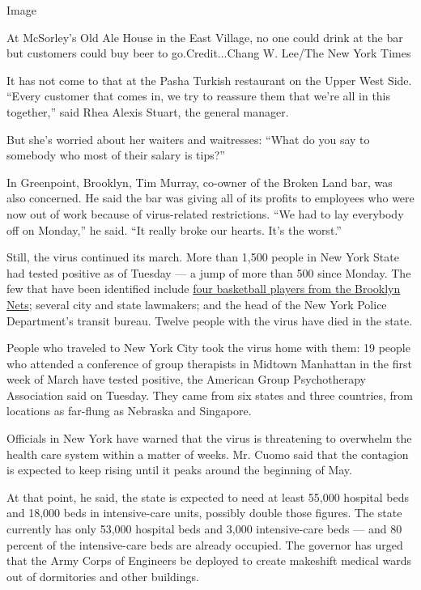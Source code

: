 Image

At McSorley's Old Ale House in the East Village, no one could drink at
the bar but customers could buy beer to go.Credit...Chang W. Lee/The New
York Times

It has not come to that at the Pasha Turkish restaurant on the Upper
West Side. ``Every customer that comes in, we try to reassure them that
we're all in this together,'' said Rhea Alexis Stuart, the general
manager.

But she's worried about her waiters and waitresses: ``What do you say to
somebody who most of their salary is tips?''

In Greenpoint, Brooklyn, Tim Murray, co-owner of the Broken Land bar,
was also concerned. He said the bar was giving all of its profits to
employees who were now out of work because of virus-related
restrictions. ``We had to lay everybody off on Monday,'' he said. ``It
really broke our hearts. It's the worst.''

Still, the virus continued its march. More than 1,500 people in New York
State had tested positive as of Tuesday --- a jump of more than 500
since Monday. The few that have been identified include
\href{https://www.nytimes3xbfgragh.onion/2020/03/17/sports/brooklyn-nets-coronavirus.html}{four
basketball players from the Brooklyn Nets}; several city and state
lawmakers; and the head of the New York Police Department's transit
bureau. Twelve people with the virus have died in the state.

People who traveled to New York City took the virus home with them: 19
people who attended a conference of group therapists in Midtown
Manhattan in the first week of March have tested positive, the American
Group Psychotherapy Association said on Tuesday. They came from six
states and three countries, from locations as far-flung as Nebraska and
Singapore.

Officials in New York have warned that the virus is threatening to
overwhelm the health care system within a matter of weeks. Mr. Cuomo
said that the contagion is expected to keep rising until it peaks around
the beginning of May.

At that point, he said, the state is expected to need at least 55,000
hospital beds and 18,000 beds in intensive-care units, possibly double
those figures. The state currently has only 53,000 hospital beds and
3,000 intensive-care beds --- and 80 percent of the intensive-care beds
are already occupied. The governor has urged that the Army Corps of
Engineers be deployed to create makeshift medical wards out of
dormitories and other buildings.

